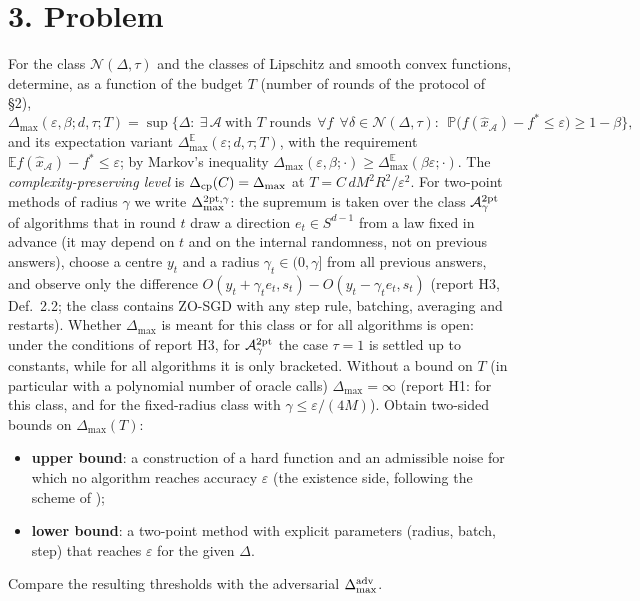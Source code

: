 \documentclass[10pt,a4paper]{article}
\newcommand{\E}{\mathbb E}\newcommand{\R}{\mathbb R}
\newcommand{\Dmax}{\Delta_{\max}}
\theoremstyle{definition}\newtheorem{definition}{Definition}
\begin{document}
\section*{3. Problem}
\begin{tcolorbox}[box,title={Goal}]
For the class $\mathcal N(\Delta,\tau)$ and the classes of Lipschitz and smooth convex functions, determine, as a function of the budget $T$ (number of rounds of the protocol of \S2),
\[
\Dmax(\varepsilon,\beta;d,\tau;T)=\sup\big\{\Delta:\ \exists\,\mathcal A\ \text{with $T$ rounds}\ \ \forall f\ \ \forall\delta\in\mathcal N(\Delta,\tau):\ \ \mathbb P\big(f(\hat x_{\mathcal A})-f^*\le\varepsilon\big)\ge1-\beta\big\},
\]
and its expectation variant $\Dmax^{\E}(\varepsilon;d,\tau;T)$, with the requirement $\E f(\hat x_{\mathcal A})-f^*\le\varepsilon$; by Markov's inequality $\Dmax(\varepsilon,\beta;\cdot)\ge\Dmax^{\E}(\beta\varepsilon;\cdot)$. The \emph{complexity-preserving level} is $\Delta_{\rm cp}(C)=\Dmax$ at $T=C\,dM^2R^2/\varepsilon^2$. For two-point methods of radius $\gamma$ we write $\Dmax^{2\rm pt,\gamma}$: the supremum is taken over the class $\mathcal A^{2\rm pt}_\gamma$ of algorithms that in round $t$ draw a direction $e_t\in S^{d-1}$ from a law fixed in advance (it may depend on $t$ and on the internal randomness, not on previous answers), choose a centre $y_t$ and a radius $\gamma_t\in(0,\gamma]$ from all previous answers, and observe only the difference $O(y_t+\gamma_te_t,s_t)-O(y_t-\gamma_te_t,s_t)$ (report H3, Def.~2.2; the class contains ZO-SGD with any step rule, batching, averaging and restarts). Whether $\Dmax$ is meant for this class or for all algorithms is open: under the conditions of report H3, for $\mathcal A^{2\rm pt}_\gamma$ the case $\tau=1$ is settled up to constants, while for all algorithms it is only bracketed. Without a bound on $T$ (in particular with a polynomial number of oracle calls) $\Dmax=\infty$ (report H1: for this class, and for the fixed-radius class with $\gamma\le\varepsilon/(4M)$). Obtain two-sided bounds on $\Dmax(T)$:
\begin{itemize}
\item \textbf{upper bound}: a construction of a hard function and an admissible noise for which no algorithm reaches accuracy $\varepsilon$ (the existence side, following the scheme of \cite{pasechnyuk});
\item \textbf{lower bound}: a two-point method with explicit parameters (radius, batch, step) that reaches $\varepsilon$ for the given $\Delta$.
\end{itemize}
Compare the resulting thresholds with the adversarial $\Dmax^{\rm adv}$.
\end{tcolorbox}
\end{document}
